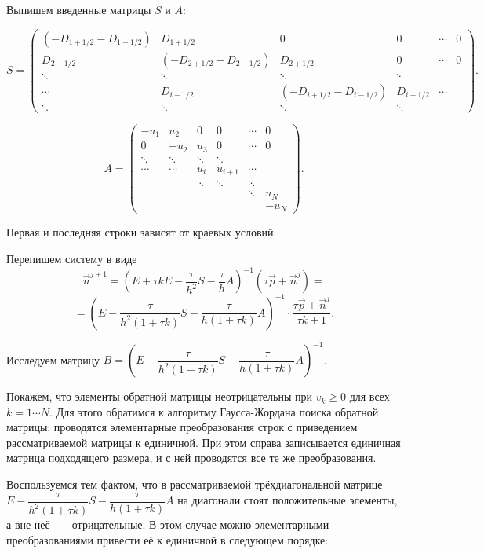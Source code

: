 \documentclass[12pt, a5paper, fleqn, twoside]{article}
\theoremstyle{definiton}
\theoremstyle{definition}
\let\geq\geqslant
\begin{document}
Выпишем введенные матрицы $S$ и $A$:

$$S = \left(\begin{smallmatrix}
(-D_{1+1/2}-D_{1-1/2}) & D_{1+1/2}             & 0        & 0  & \cdots & 0 \\
D_{2-1/2}              & (-D_{2+1/2}-D_{2-1/2}) & D_{2+1/2} & 0  & \cdots & 0 \\         
\ddots & \ddots & \ddots & \ddots \\
\cdots & D_{i-1/2} & (-D_{i+1/2}-D_{i-1/2}) & D_{i+1/2} &  \cdots &  \\
\ddots & \ddots & \ddots & \ddots
\end{smallmatrix}\right).$$

$$A=\left(\begin{matrix}
-u_1 &  u_2 & 0   & 0  & \cdots & 0 \\
0    & -u_2 & u_3 & 0  & \cdots & 0 \\         
\ddots & \ddots & \ddots & \ddots \\
\cdots & \cdots & u_i & u_{i+1} &  \cdots &  \\
& & \ddots & \ddots & \ddots\\
& & & & \ddots& u_N\\
& & & & & -u_N
\end{matrix}\right).$$

\smallskip

Первая и последняя строки зависят от краевых условий.

Перепишем систему в виде $$\vec{n}^{j+1}=(E+\tau k E-\dfrac{\tau}{h^2} S-\dfrac{\tau}{h}A)^{-1}(\tau \vec{p}+\vec{n}^j)=$$ $$=\left(E-\dfrac{\tau}{h^2(1+\tau k)}S-\dfrac{\tau}{h(1+\tau k)}A\right)^{-1}\cdot \dfrac{\tau \vec{p}+\vec{n}^j}{\tau k + 1}.$$

Исследуем матрицу $B=\left(E-\dfrac{\tau}{h^2(1+\tau k)}S-\dfrac{\tau}{h(1+\tau k)}A\right)^{-1}$. 

\smallskip
Покажем, что элементы обратной матрицы неотрицательны при $v_k\geq 0$ для всех $k=1\cdots N$. Для этого обратимся к алгоритму Гаусса-Жордана поиска обратной матрицы: проводятся элементарные преобразования строк с приведением рассматриваемой матрицы к единичной. При этом справа записывается единичная матрица подходящего размера, и с ней проводятся все те же преобразования.

\smallskip
Воспользуемся тем фактом, что в рассматриваемой трёхдиагональной матрице $E-\dfrac{\tau}{h^2(1+\tau k)}S-\dfrac{\tau}{h(1+\tau k)}A$ на диагонали стоят положительные элементы, а вне неё~---~отрицательные. В этом случае можно элементарными преобразованиями привести её к единичной в следующем порядке:
\end{document}
